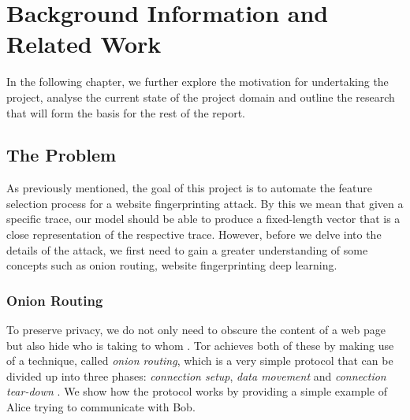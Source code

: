 \chapter{Background Information and Related Work}

In the following chapter, we further explore the motivation for undertaking the project,
analyse the current state of the project domain and outline the research that will form the basis for the rest of the report.

\section{The Problem}

As previously mentioned, the goal of this project is to automate the feature selection process for a website fingerprinting attack.
By this we mean that given a specific trace, our model should be able to produce a fixed-length vector that is a close representation of the respective trace.
However, before we delve into the details of the attack, we first need to gain a greater understanding of some concepts such as
onion routing, website fingerprinting deep learning.

\subsection{Onion Routing}

To preserve privacy, we do not only need to obscure the content of a web page but also hide who is taking to whom \cite{goldschlag1999onion}.
Tor achieves both of these by making use of a technique, called \textit{onion routing}, which is a very simple protocol that can be divided up into three phases:
\textit{connection setup}, \textit{data movement} and \textit{connection tear-down} \cite{goldschlag1999onion}.
We show how the protocol works by providing a simple example of Alice trying to communicate with Bob.

